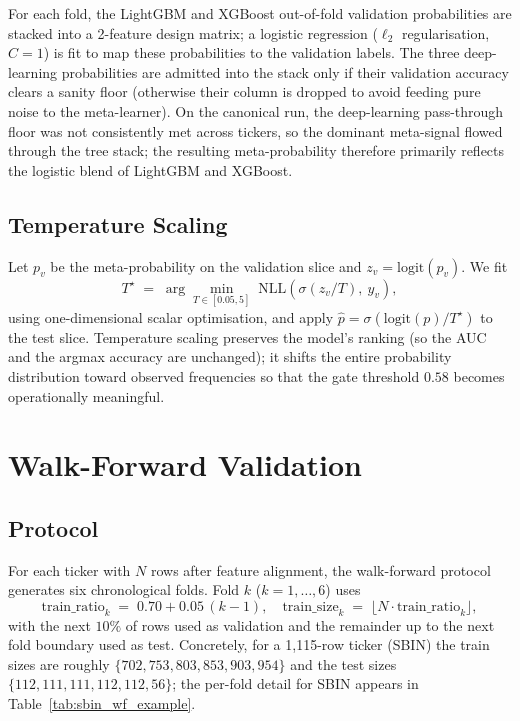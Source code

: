 For each fold, the LightGBM and XGBoost out-of-fold validation probabilities are stacked into a 2-feature design matrix; a logistic regression ($\ell_2$ regularisation, $C=1$) is fit to map these probabilities to the validation labels. The three deep-learning probabilities are admitted into the stack only if their validation accuracy clears a sanity floor (otherwise their column is dropped to avoid feeding pure noise to the meta-learner). On the canonical run, the deep-learning pass-through floor was not consistently met across tickers, so the dominant meta-signal flowed through the tree stack; the resulting meta-probability therefore primarily reflects the logistic blend of LightGBM and XGBoost.

\subsection{Temperature Scaling}

Let $p_v$ be the meta-probability on the validation slice and $z_v = \mathrm{logit}(p_v)$. We fit
\[
T^\star \;=\; \arg\min_{T \in [0.05, 5]} \; \mathrm{NLL}\!\left(\sigma(z_v / T),\ y_v\right),
\]
using one-dimensional scalar optimisation, and apply $\hat p = \sigma(\mathrm{logit}(p) / T^\star)$ to the test slice. Temperature scaling preserves the model's ranking (so the AUC and the argmax accuracy are unchanged); it shifts the entire probability distribution toward observed frequencies so that the gate threshold $0.58$ becomes operationally meaningful.

\section{Walk-Forward Validation}\label{sec:walkforward}

\subsection{Protocol}

For each ticker with $N$ rows after feature alignment, the walk-forward protocol generates six chronological folds. Fold $k$ ($k=1,\dots,6$) uses
\[
    \mathrm{train\_ratio}_k \;=\; 0.70 + 0.05\,(k-1), \quad
    \mathrm{train\_size}_k \;=\; \lfloor N \cdot \mathrm{train\_ratio}_k \rfloor,
\]
with the next $10\%$ of rows used as validation and the remainder up to the next fold boundary used as test. Concretely, for a 1{,}115-row ticker (SBIN) the train sizes are roughly $\{702, 753, 803, 853, 903, 954\}$ and the test sizes $\{112, 111, 111, 112, 112, 56\}$; the per-fold detail for SBIN appears in Table~\ref{tab:sbin_wf_example}.


